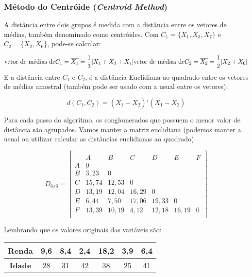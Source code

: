 \documentclass[
]{book}
\begin{document}
\hypertarget{muxe9todo-do-centruxf3ide-centroid-method}{%
\subsubsection{\texorpdfstring{Método do Centróide (\emph{Centroid Method})}{Método do Centróide (Centroid Method)}}\label{muxe9todo-do-centruxf3ide-centroid-method}}

A distância entre dois grupos é medida com a distância entre os vetores de médias, também denominado como centróides. Com \(C_1=\{X_1,X_3,X_7\}\) e \(C_2=\{X_2,X_6\}\), pode-se calcular:

\[\mbox{vetor de médias de} C_1=\overline{X_1}=\frac{1}{3}[X_1+X_3+X_7] \\
\mbox{vetor de médias de} C_2=\overline{X_2}=\frac{1}{2}[X_2+X_6]\]
E a distância entre \(C_1\) e \(C_2\), é a distância Euclidiana ao quadrado entre os vetores de médias amostral (também pode ser usado com a usual entre os vetores):

\begin{equation}
d(C_1,C_2)= (\overline{X_1}-\overline{X_2})'(\overline{X_1}-\overline{X_2})
 \label{eq:distcentroide}
\end{equation}

Para cada passo do algoritmo, os conglomerados que possuem o menor valor de distância são agrupados. Vamos manter a matriz euclidiana (podemos manter a usual ou utilizar calcular as distâncias euclidianas ao quadrado)

\[D_{6x6}=\begin{bmatrix}\\
 &A&B&C&D&E&F \\
 A&0&&&&&\\
 B&3,23&0&&&&\\
 C & 15,74& 12,53&0&&&\\
 D& 13,19& 12,04& 16,29&0&&\\
 E& 6,44& 7,50& 17,06& 19,33&0&\\
 F& 13,39& 10,19& 4,12& 12,18& 16,19&0 \\
\end{bmatrix}\]

Lembrando que os valores originais das variáveis são:

\begin{longtable}[]{@{}ccccccc@{}}
\toprule
\textbf{Renda} & 9,6 & 8,4 & 2,4 & 18,2 & 3,9 & 6,4\tabularnewline
\midrule
\endhead
\textbf{Idade} & 28 & 31 & 42 & 38 & 25 & 41\tabularnewline
\bottomrule
\end{longtable}
\end{document}
